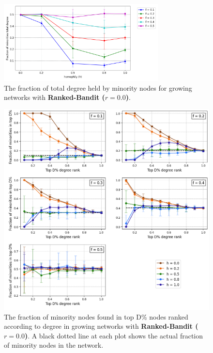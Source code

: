 \begin{appendices}
\begin{figure}
	\centering
	\includegraphics[trim=0 5 0 10, clip, width=0.75\textwidth]{images/mf_growth_rb00.png}
	\caption{The fraction of total degree held by minority nodes for growing networks with \textbf{Ranked-Bandit ($r = 0.0$)}.}
	\label{mf_growth_rb00_fig}
\end{figure}

\begin{figure}[h!]
	\centering
	\includegraphics[trim=0 10 0 5, clip, width=1.0\textwidth]{images/top_growth_rb00.png}
	\caption{The fraction of minority nodes found in top D\% nodes ranked according to degree in growing networks with \textbf{Ranked-Bandit ($r = 0.0$)}. A black dotted line at each plot shows the actual fraction of minority nodes in the network.}
	\label{top_growth_rb00_fig}
\end{figure}


\end{appendices}
